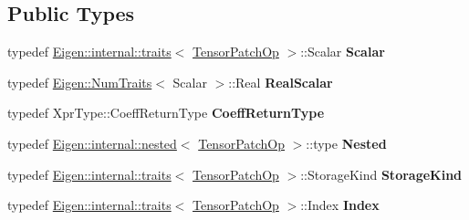 \subsection*{Public Types}
\begin{DoxyCompactItemize}
\item 
\mbox{\label{class_eigen_1_1_tensor_patch_op_a47ef895b2781f56d8037f990282310af}} 
typedef \hyperlink{struct_eigen_1_1internal_1_1traits}{Eigen\+::internal\+::traits}$<$ \hyperlink{class_eigen_1_1_tensor_patch_op}{Tensor\+Patch\+Op} $>$\+::Scalar {\bfseries Scalar}
\item 
\mbox{\label{class_eigen_1_1_tensor_patch_op_a6832903a926f4fd8aece0b6714dc32fb}} 
typedef \hyperlink{group___core___module_struct_eigen_1_1_num_traits}{Eigen\+::\+Num\+Traits}$<$ Scalar $>$\+::Real {\bfseries Real\+Scalar}
\item 
\mbox{\label{class_eigen_1_1_tensor_patch_op_a8de8e6f06026f5017f2af3c0c499d806}} 
typedef Xpr\+Type\+::\+Coeff\+Return\+Type {\bfseries Coeff\+Return\+Type}
\item 
\mbox{\label{class_eigen_1_1_tensor_patch_op_a94c5b255acaf48de2f533846461da7f1}} 
typedef \hyperlink{struct_eigen_1_1internal_1_1nested}{Eigen\+::internal\+::nested}$<$ \hyperlink{class_eigen_1_1_tensor_patch_op}{Tensor\+Patch\+Op} $>$\+::type {\bfseries Nested}
\item 
\mbox{\label{class_eigen_1_1_tensor_patch_op_a1fcdc10e6bb1228a0d084f4d302c5df1}} 
typedef \hyperlink{struct_eigen_1_1internal_1_1traits}{Eigen\+::internal\+::traits}$<$ \hyperlink{class_eigen_1_1_tensor_patch_op}{Tensor\+Patch\+Op} $>$\+::Storage\+Kind {\bfseries Storage\+Kind}
\item 
\mbox{\label{class_eigen_1_1_tensor_patch_op_a39afbf0a24b9c6be84b53c5a36dc03fd}} 
typedef \hyperlink{struct_eigen_1_1internal_1_1traits}{Eigen\+::internal\+::traits}$<$ \hyperlink{class_eigen_1_1_tensor_patch_op}{Tensor\+Patch\+Op} $>$\+::Index {\bfseries Index}
\item 
\mbox{\label{class_eigen_1_1_tensor_patch_op_a47ef895b2781f56d8037f990282310af}} 

\end{DoxyCompactItemize}
